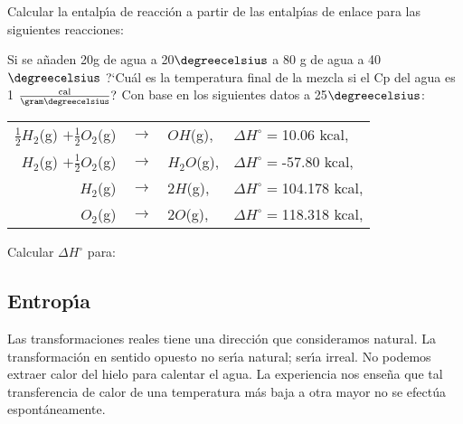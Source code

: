 \begin{exercises}
\exer Calcular la entalp\'{\i}a de reacci\'on a partir de las entalp\'{\i}as de enlace para las siguientes reacciones:
\subexer {}

\subexer {}

\subexer{}

\exer Si se a\~naden 20g de agua a 20$\degreecelsius$ a 80 g de agua a 40 $\degreecelsius$ ?`Cu\'al es la temperatura final de la mezcla si el Cp del agua es 1 $\frac{\textrm{cal}}{\gram\degreecelsius}?$
\exer Con base en los siguientes datos a 25$\degreecelsius$:

{\centering
\vskip6pt
\begin{tabular}{rcll} 
$\frac{1}{2}H_2${\footnotesize (g)}
$+\frac{1}{2}O_2${\footnotesize (g)}  &
$\longrightarrow$ &
$OH${\footnotesize (g)},&
$\Delta H^\circ = $10.06 kcal,\\
$H_2${\footnotesize (g)}
$+\frac{1}{2}O_2${\footnotesize (g)} &
$\longrightarrow$ &
$H_2O${\footnotesize (g)},&
$\Delta H^\circ = $-57.80 kcal,\\ 
$ H_2${\footnotesize (g)} &
$\longrightarrow$ &
$2H${\footnotesize (g)},&
$\Delta H^\circ = $104.178 kcal,\\
$ O_2${\footnotesize (g)} &
$\longrightarrow$ &
$2O${\footnotesize (g)},&
$\Delta H^\circ = $118.318 kcal,\\
\end{tabular}
\vskip6pt
}
Calcular $\Delta H^\circ$ para:
\subexer {}
\subexer {}
\subexer {}
\end{exercises}


\subsection{Entrop\'{\i}a}

Las transformaciones reales tiene una direcci\'on que consideramos natural. La transformaci\'on en sentido opuesto no ser\'{\i}a natural; ser\'{\i}a irreal. No podemos extraer calor del hielo para calentar el agua. La experiencia nos ense\~na  que tal transferencia de calor de una temperatura m\'as baja a otra mayor no se efect\'ua espont\'aneamente.

